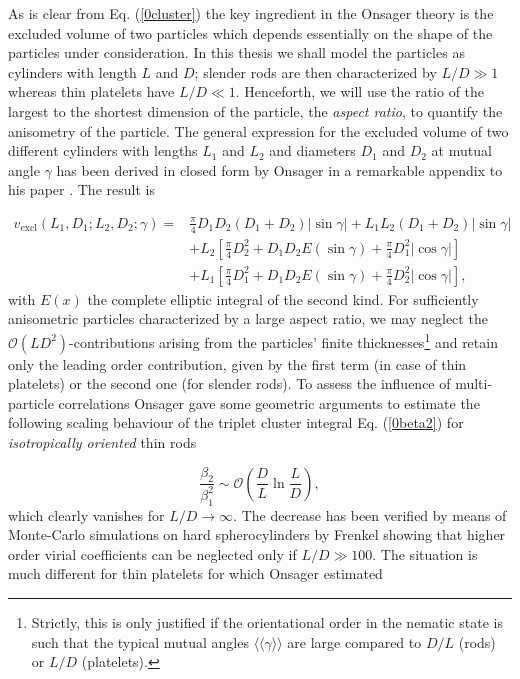 As is clear from Eq. (\ref{0cluster}) the key ingredient in the Onsager theory is the excluded volume of two particles which depends essentially on the shape of the particles under consideration. In this thesis we shall model the particles as cylinders with length $L$ and $D$; slender rods are then characterized by  $L/D\gg 1$ whereas thin platelets have $L/D\ll 1$. Henceforth, we will use the ratio of the largest to the shortest dimension of the particle, the {\em aspect ratio}, to quantify the anisometry of the particle. The general expression for the excluded volume of two different cylinders with lengths $L_{1}$ and $L_{2}$ and diameters $D_{1}$ and $D_{2}$ at mutual angle $\gamma$ has been derived in closed form by Onsager in a remarkable appendix to his paper \cite{onsager1949}. The result is

\begin{align}
v_{\text{excl}}(L_{1},D_{1};L_{2},D_{2};\gamma)=& \frac{\pi}{4}D_{1}D_{2}(D_{1}+D_{2})\left|\sin\gamma\right| +L_{1}L_{2}(D_{1}+D_{2})
\left|\sin\gamma\right| \nonumber  \\
&+L_{2}\left[\frac{\pi}{4}D_{2}^{2}+D_{1}D_{2}E(\sin\gamma)+\frac{\pi}{4}D_{1}^{2} \left|\cos\gamma \right| \right] \nonumber \\
&+L_{1}\left[\frac{\pi}{4}D_{1}^{2}+D_{1}D_{2}E(\sin\gamma)+\frac{\pi}{4}D_{2}^{2} \left|\cos\gamma \right| \right],
\label{0evonsager}
\end{align}
with $E(x)$ the complete elliptic integral of the second kind. For sufficiently anisometric particles characterized by a  large aspect ratio, we may neglect the $\mathcal{O}(LD^{2})$-contributions arising from the particles' finite thicknesses\footnote{Strictly,
this is only justified if the orientational order in the nematic state is such that the  typical mutual angles $ \langle\langle\gamma \rangle\rangle $ are large compared
to $D/L$ (rods) or $L/D$ (platelets).} and  retain only the leading order contribution, given by the first term (in case of thin platelets) or the second one (for slender rods). To assess the influence of  multi-particle correlations Onsager gave some geometric arguments to estimate the following scaling behaviour of the triplet cluster integral Eq. (\ref{0beta2}) for {\em isotropically oriented} thin rods

\begin{equation}
\frac{\beta_{2}}{\beta_{1}^{2}}\sim \mathcal{O}\left(\frac{D}{L}\ln\frac{L}{D}\right),
\end{equation}
which clearly vanishes for $L/D \rightarrow \infty $. The decrease  has been  verified by means of Monte-Carlo simulations on hard spherocylinders by Frenkel \cite{Frenkel87,Frenkel87err} showing that higher order virial coefficients can be neglected only if $L/D\gg 100$. The situation is much different for thin platelets for which Onsager estimated

